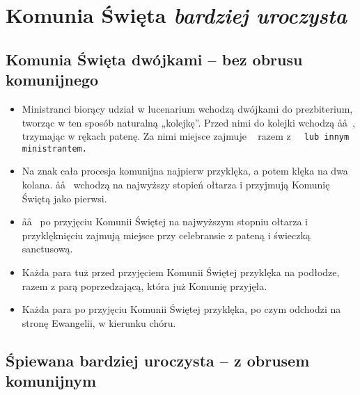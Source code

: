 	\section{Komunia Święta \textit{bardziej uroczysta}}
	
		\subsection{Komunia Święta dwójkami – bez obrusu komunijnego}
		
			\begin{itemize}
				\item Ministranci biorący udział w lucenarium wchodzą dwójkami do prezbiterium, tworząc w ten sposób naturalną „kolejkę”. Przed nimi do kolejki wchodzą \aa\aa~, trzymając w rękach patenę. Za nimi miejsce zajmuje \cc~ razem z \tt~ lub innym ministrantem.
				\item Na znak \cc cała procesja komunijna najpierw przyklęka, a potem klęka na dwa kolana. \aa\aa~ wchodzą na najwyższy stopień ołtarza i przyjmują Komunię Świętą jako pierwsi.
				\item \aa\aa~ po przyjęciu Komunii Świętej na najwyższym stopniu ołtarza i przyklęknięciu zajmują miejsce przy celebransie z pateną i świeczką sanctusową.
				\item Każda para tuż przed przyjęciem Komunii Świętej przyklęka na podłodze, razem z parą poprzedzającą, która już Komunię przyjęła.
				\item Każda para po przyjęciu Komunii Świętej przyklęka, po czym odchodzi na stronę Ewangelii, w kierunku chóru.
			\end{itemize}
	
		\subsection{Śpiewana bardziej uroczysta – z obrusem komunijnym}
		
